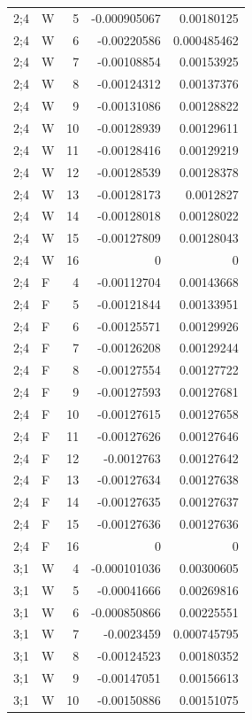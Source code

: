 {\begin{longtable}{@{}llrrr@{}}
2;4 & W & 5 & -0.000905067 & 0.00180125 \\
2;4 & W & 6 & -0.00220586 & 0.000485462 \\
2;4 & W & 7 & -0.00108854 & 0.00153925 \\
2;4 & W & 8 & -0.00124312 & 0.00137376 \\
2;4 & W & 9 & -0.00131086 & 0.00128822 \\
2;4 & W & 10 & -0.00128939 & 0.00129611 \\
2;4 & W & 11 & -0.00128416 & 0.00129219 \\
2;4 & W & 12 & -0.00128539 & 0.00128378 \\
2;4 & W & 13 & -0.00128173 & 0.0012827 \\
2;4 & W & 14 & -0.00128018 & 0.00128022 \\
2;4 & W & 15 & -0.00127809 & 0.00128043 \\
2;4 & W & 16 & 0 & 0 \\
2;4 & F & 4 & -0.00112704 & 0.00143668 \\
2;4 & F & 5 & -0.00121844 & 0.00133951 \\
2;4 & F & 6 & -0.00125571 & 0.00129926 \\
2;4 & F & 7 & -0.00126208 & 0.00129244 \\
2;4 & F & 8 & -0.00127554 & 0.00127722 \\
2;4 & F & 9 & -0.00127593 & 0.00127681 \\
2;4 & F & 10 & -0.00127615 & 0.00127658 \\
2;4 & F & 11 & -0.00127626 & 0.00127646 \\
2;4 & F & 12 & -0.0012763 & 0.00127642 \\
2;4 & F & 13 & -0.00127634 & 0.00127638 \\
2;4 & F & 14 & -0.00127635 & 0.00127637 \\
2;4 & F & 15 & -0.00127636 & 0.00127636 \\
2;4 & F & 16 & 0 & 0 \\
3;1 & W & 4 & -0.000101036 & 0.00300605 \\
3;1 & W & 5 & -0.00041666 & 0.00269816 \\
3;1 & W & 6 & -0.000850866 & 0.00225551 \\
3;1 & W & 7 & -0.0023459 & 0.000745795 \\
3;1 & W & 8 & -0.00124523 & 0.00180352 \\
3;1 & W & 9 & -0.00147051 & 0.00156613 \\
3;1 & W & 10 & -0.00150886 & 0.00151075 \\

\end{longtable}}
